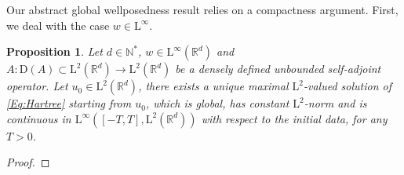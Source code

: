\documentclass{article}
\def\R{\mathbb R}
\def\N{\mathbb N}
\def\L{\mathrm L}
\newtheorem{prop}[theo]{Proposition}
\theoremstyle{definition}
\numberwithin{equation}{section}
\begin{document}
Our abstract global wellposedness result relies on a compactness argument. First, we deal with the case $w\in\L^\infty$.

\begin{prop}

    Let $d\in\N^*$, $w\in\L^\infty(\R^d)$ and $A:\mathrm{D}(A)\subset\L^2(\R^d)\to\L^2(\R^d)$ be a densely defined unbounded self-adjoint operator. Let $u_0\in\L^2(\R^d)$, there exists a unique maximal $\L^2$-valued solution of \cref{Eq:Hartree} starting from $u_0$, which is global, has constant $\L^2$-norm and is continuous in $\L^\infty([-T,T],\L^2(\R^d))$ with respect to the initial data, for any $T>0$.
    
\end{prop}

\begin{proof}


\end{proof}
\end{document}
